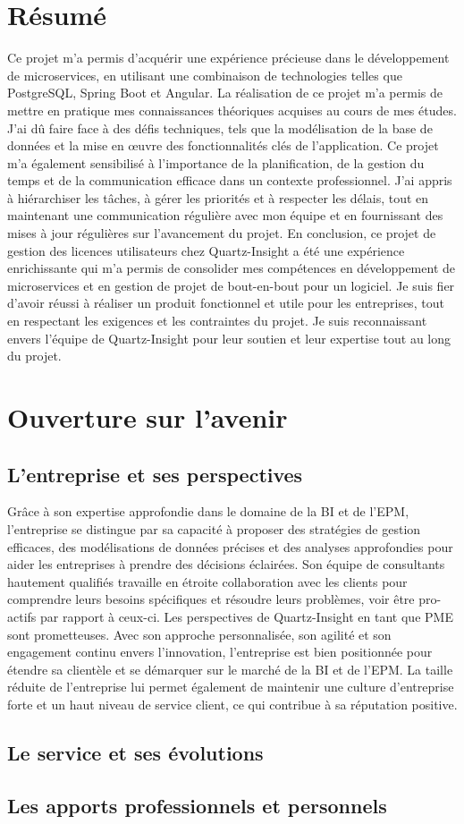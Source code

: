 \documentclass[a4paper, 11pt]{report}
\begin{document}
\section{Résumé}
Ce projet m'a permis d'acquérir une expérience précieuse dans le dévelop\-pement de microservices, en utilisant une combinaison de technologies telles que PostgreSQL, Spring Boot et Angular.
La réalisation de ce projet m'a permis de mettre en pratique mes connaissances théoriques acquises au cours de mes études.
J'ai dû faire face à des défis techniques, tels que la modélisation de la base de données et la mise en œuvre des fonctionnalités clés de l'application.
Ce projet m'a également sensibilisé à l'importance de la planification, de la gestion du temps et de la communication efficace dans un contexte professionnel.
J'ai appris à hiérarchiser les tâches, à gérer les priorités et à respecter les délais, tout en maintenant une communication régulière avec mon équipe et en fournissant des mises à jour régulières sur l'avancement du projet.
\newline
\newline
En conclusion, ce projet de gestion des licences utilisateurs chez Quartz-Insight a été une expérience enrichissante qui m'a permis de consolider mes compétences en développement de microservices et en gestion de projet de bout-en-bout pour un logiciel.
Je suis fier d'avoir réussi à réaliser un produit fonctionnel et utile pour les entreprises, tout en respectant les exigences et les contraintes du projet.
Je suis reconnaissant envers l'équipe de Quartz-Insight pour leur soutien et leur expertise tout au long du projet.
\section{Ouverture sur l'avenir}

\subsection{L'entreprise et ses perspectives}
Grâce à son expertise approfondie dans le domaine de la BI et de l'EPM, l’entreprise se distingue par sa capacité à proposer des stratégies de gestion efficaces, des modélisations de données précises et des analyses approfondies pour aider les entreprises à prendre des décisions éclairées.
Son équipe de consultants hautement qualifiés travaille en étroite collaboration avec les clients pour comprendre leurs besoins spécifiques et résoudre leurs problèmes, voir être pro-actifs par rapport à ceux-ci.
\newline
\newline
Les perspectives de Quartz-Insight en tant que PME sont prometteuses.
Avec son approche personnalisée, son agilité et son engagement continu envers l'innovation, l'entreprise est bien positionnée pour étendre sa clientèle et se démarquer sur le marché de la BI et de l'EPM.
La taille réduite de l'entreprise lui permet également de maintenir une culture d'entreprise forte et un haut niveau de service client, ce qui contribue à sa réputation positive.

\subsection{Le service et ses évolutions}

\subsection{Les apports professionnels et personnels}
\end{document}
